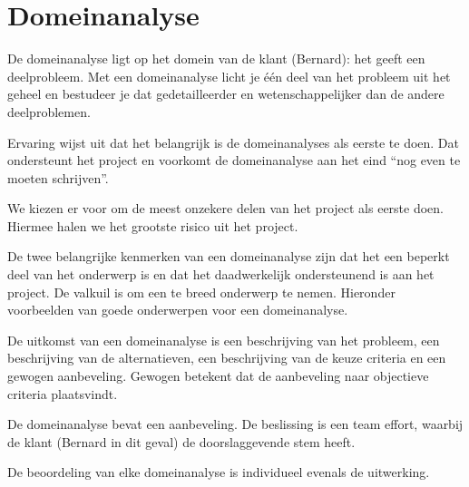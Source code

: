 
\section{Domeinanalyse}

De domeinanalyse ligt op het domein van de klant (Bernard): het geeft een deelprobleem. Met een domeinanalyse licht je
\'e\'en deel van het probleem uit het geheel en bestudeer je dat gedetailleerder en wetenschappelijker dan de andere deelproblemen.

Ervaring wijst uit dat het belangrijk is de domeinanalyses als eerste te doen. Dat ondersteunt het project en voorkomt
de domeinanalyse aan het eind ``nog even te moeten schrijven''.

We kiezen er voor om de meest onzekere delen van het project als eerste doen. Hiermee halen we het grootste risico uit het
project.

De twee belangrijke kenmerken van een domeinanalyse zijn dat het een beperkt deel van het onderwerp is en dat het daadwerkelijk
ondersteunend is aan het project. De valkuil is om een te breed onderwerp te nemen. Hieronder voorbeelden van goede onderwerpen
voor een domeinanalyse.

De uitkomst van een domeinanalyse is een beschrijving van het probleem,
een beschrijving van de alternatieven, een beschrijving van de keuze criteria en een gewogen aanbeveling. Gewogen betekent dat de aanbeveling naar objectieve criteria plaatsvindt.

De domeinanalyse bevat een aanbeveling. De beslissing is een team effort, waarbij de klant (Bernard in dit geval) de doorslaggevende stem heeft.

De beoordeling van elke domeinanalyse is individueel evenals de uitwerking.

